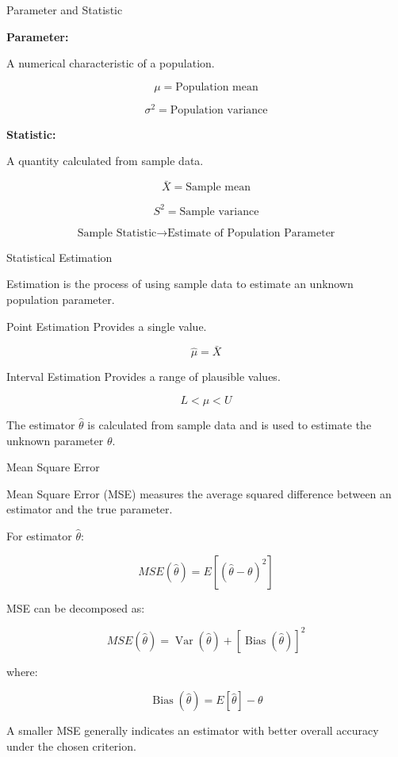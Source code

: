 \documentclass[aspectratio=169]{beamer}
\begin{document}
\begin{frame}{Parameter and Statistic}

\textbf{Parameter:}

A numerical characteristic of a population.

\[
\mu=\text{Population mean}
\]

\[
\sigma^2=\text{Population variance}
\]

\vspace{0.3cm}

\textbf{Statistic:}

A quantity calculated from sample data.

\[
\bar X=\text{Sample mean}
\]

\[
S^2=\text{Sample variance}
\]

\vspace{0.3cm}

\begin{center}
\[
\boxed{\text{Sample Statistic}\rightarrow\text{Estimate of Population Parameter}}
\]
\end{center}
\end{frame}

\begin{frame}{Statistical Estimation}

Estimation is the process of using sample data to estimate
an unknown population parameter.

\begin{block}{Point Estimation}
Provides a single value.

\[
\hat{\mu}=\bar X
\]
\end{block}

\begin{block}{Interval Estimation}
Provides a range of plausible values.

\[
L<\mu<U
\]
\end{block}

The estimator $\hat{\theta}$ is calculated from sample data
and is used to estimate the unknown parameter $\theta$.
\end{frame}

\begin{frame}{Mean Square Error}

Mean Square Error (MSE) measures the average squared difference
between an estimator and the true parameter.

For estimator $\hat{\theta}$:

\[
\boxed{
MSE(\hat{\theta})
=
E[(\hat{\theta}-\theta)^2]
}
\]

MSE can be decomposed as:

\[
\boxed{
MSE(\hat{\theta})
=
\operatorname{Var}(\hat{\theta})
+
[\operatorname{Bias}(\hat{\theta})]^2
}
\]

where:

\[
\operatorname{Bias}(\hat{\theta})
=
E[\hat{\theta}]-\theta
\]

A smaller MSE generally indicates an estimator with better
overall accuracy under the chosen criterion.
\end{frame}
\end{document}
